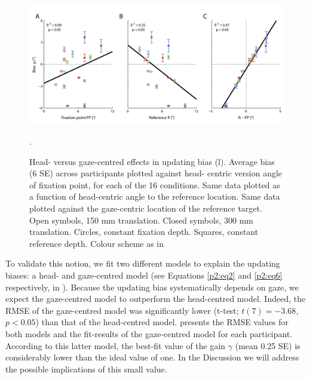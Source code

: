 \begin{figure}
    \includegraphics[width=1.0\textwidth]{src/paper2/figure4.pdf}
    
    \caption{Head- versus gaze-centred effects in updating bias (l).  Average bias (6 SE) across participants plotted against head- centric version angle of fixation point, for each of the 16 conditions.  Same data plotted as a function of head-centric angle to the reference location.  Same data plotted against the gaze-centric location of the reference target. Open symbols, 150 mm translation. Closed symbols, 300 mm translation. Circles, constant fixation depth. Squares, constant reference depth. Colour scheme as in }.
    
    \label{p2:fig4}
\end{figure}

To validate this notion, we fit two different models to explain the updating biases: a head- and gaze-centred model (see Equations \ref{p2:eq2} and \ref{p2:eq6} respectively, in ). Because the updating bias systematically depends on gaze, we expect the gaze-centred model to outperform the head-centred model. Indeed, the RMSE of the gaze-centred model was significantly lower (t-test; $t(7) = -3.68$, $p < 0.05$) than that of the head-centred model.  presents the RMSE values for both models and the fit-results of the gaze-centred model for each participant. According to this latter model, the best-fit value of the gain $\gamma$ (mean 0.25  SE) is considerably lower than the ideal value of one. In the Discussion we will address the possible implications of this small value.

